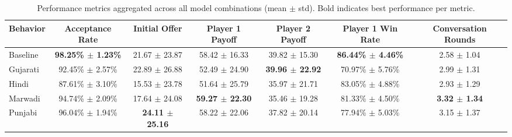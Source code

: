 \begin{table}[htbp]
\centering
\small
\begin{tabular}{lcccccc}
\toprule
Behavior & Acceptance Rate & Initial Offer & Player 1 Payoff & Player 2 Payoff & Player 1 Win Rate & Conversation Rounds \\
\midrule
Baseline & \textbf{98.25\% $\pm$ 1.23\%} & 21.67 $\pm$ 23.87 & 58.42 $\pm$ 16.33 & 39.82 $\pm$ 15.30 & \textbf{86.44\% $\pm$ 4.46\%} & 2.58 $\pm$ 1.04 \\
Gujarati & 92.45\% $\pm$ 2.57\% & 22.89 $\pm$ 26.88 & 52.49 $\pm$ 24.90 & \textbf{39.96 $\pm$ 22.92} & 70.97\% $\pm$ 5.76\% & 2.99 $\pm$ 1.31 \\
Hindi & 87.61\% $\pm$ 3.10\% & 15.53 $\pm$ 23.78 & 51.64 $\pm$ 25.79 & 35.97 $\pm$ 21.71 & 83.05\% $\pm$ 4.88\% & 2.93 $\pm$ 1.29 \\
Marwadi & 94.74\% $\pm$ 2.09\% & 17.64 $\pm$ 24.08 & \textbf{59.27 $\pm$ 22.30} & 35.46 $\pm$ 19.28 & 81.33\% $\pm$ 4.50\% & \textbf{3.32 $\pm$ 1.34} \\
Punjabi & 96.04\% $\pm$ 1.94\% & \textbf{24.11 $\pm$ 25.16} & 58.22 $\pm$ 22.06 & 37.82 $\pm$ 20.14 & 77.94\% $\pm$ 5.03\% & 3.15 $\pm$ 1.37 \\
\bottomrule
\end{tabular}
\caption{Performance metrics aggregated across all model combinations (mean $\pm$ std). Bold indicates best performance per metric.}
\label{tab:performance_summary}
\end{table}